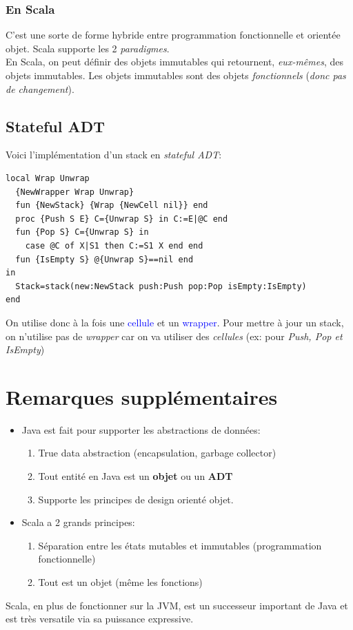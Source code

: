 \documentclass{report}
\begin{document}
\subsubsection{En Scala}
C'est une sorte de forme hybride entre programmation fonctionnelle et orientée objet. Scala supporte les 2 \textit{paradigmes}.\\
En Scala, on peut définir des objets immutables qui retournent, \textit{eux-mêmes}, des objets immutables.  Les objets immutables sont des objets \textit{fonctionnels} (\textit{donc pas de changement}).

\subsection{Stateful ADT}
Voici l'implémentation d'un stack en \textit{stateful ADT}:
\begin{lstlisting}[escapechar=\%]
local Wrap Unwrap 
  {NewWrapper Wrap Unwrap} 
  fun {NewStack} {Wrap {NewCell nil}} end 
  proc {Push S E} C={Unwrap S} in C:=E|@C end 
  fun {Pop S} C={Unwrap S} in 
    case @C of X|S1 then C:=S1 X end end 
  fun {IsEmpty S} @{Unwrap S}==nil end
in 
  Stack=stack(new:NewStack push:Push pop:Pop isEmpty:IsEmpty)
end
\end{lstlisting}
On utilise donc à la fois une \textcolor{blue}{cellule} et un \textcolor{blue}{wrapper}. Pour mettre à jour un stack, on n'utilise pas de \textit{wrapper} car on va utiliser des \textit{cellules} (ex: pour \textit{Push, Pop et IsEmpty})

\section{Remarques supplémentaires}
\begin{itemize}
\item Java est fait pour supporter les abstractions de données:
	\begin{enumerate}
	\item True data abstraction (encapsulation, garbage collector)
	\item Tout entité en Java est un \textbf{objet} ou un \textbf{ADT}
	\item Supporte les principes de design orienté objet.
	\end{enumerate}
\item Scala a 2 grands principes:
	\begin{enumerate}
	\item Séparation entre les états mutables et immutables (programmation fonctionnelle)
	\item Tout est un objet (même les fonctions)
	\end{enumerate}
\end{itemize}
Scala, en plus de fonctionner sur la JVM, est un successeur important de Java et est très versatile via sa puissance expressive.
\end{document}
